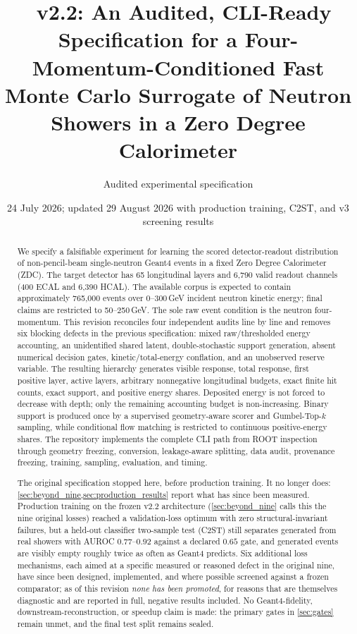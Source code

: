 \documentclass[10pt,a4paper]{article}
\title{\model\ v2.2: An Audited, CLI-Ready Specification for a Four-Momentum-Conditioned Fast Monte Carlo Surrogate of Neutron Showers in a Zero Degree Calorimeter}
\author{Audited experimental specification}
\date{24 July 2026; updated 29 August 2026 with production training, C2ST, and v3 screening results}
\begin{document}
\maketitle

\begin{abstract}
We specify a falsifiable experiment for learning the scored detector-readout distribution of non-pencil-beam single-neutron Geant4 events in a fixed Zero Degree Calorimeter (ZDC). The target detector has 65 longitudinal layers and 6,790 valid readout channels (400 ECAL and 6,390 HCAL). The available corpus is expected to contain approximately 765,000 events over 0--300\,GeV incident neutron kinetic energy; final claims are restricted to 50--250\,GeV. The sole raw event condition is the neutron four-momentum. This revision reconciles four independent audits line by line and removes six blocking defects in the previous specification: mixed raw/thresholded energy accounting, an unidentified shared latent, double-stochastic support generation, absent numerical decision gates, kinetic/total-energy conflation, and an unobserved reserve variable. The resulting hierarchy generates visible response, total response, first positive layer, active layers, arbitrary nonnegative longitudinal budgets, exact finite hit counts, exact support, and positive energy shares. Deposited energy is not forced to decrease with depth; only the remaining accounting budget is non-increasing. Binary support is produced once by a supervised geometry-aware scorer and Gumbel-Top-$k$ sampling, while conditional flow matching is restricted to continuous positive-energy shares. The repository implements the complete CLI path from ROOT inspection through geometry freezing, conversion, leakage-aware splitting, data audit, provenance freezing, training, sampling, evaluation, and timing.

The original specification stopped here, before production training. It no longer does: \cref{sec:beyond_nine,sec:production_results} report what has since been measured. Production training on the frozen $\mathrm{v2.2}$ architecture (\cref{sec:beyond_nine} calls this the nine original losses) reached a validation-loss optimum with zero structural-invariant failures, but a held-out classifier two-sample test (C2ST) still separates generated from real showers with AUROC $0.77$--$0.92$ against a declared $0.65$ gate, and generated events are visibly empty roughly twice as often as Geant4 predicts. Six additional loss mechanisms, each aimed at a specific measured or reasoned defect in the original nine, have since been designed, implemented, and where possible screened against a frozen comparator; as of this revision \emph{none has been promoted}, for reasons that are themselves diagnostic and are reported in full, negative results included. No Geant4-fidelity, downstream-reconstruction, or speedup claim is made: the primary gates in \cref{sec:gates} remain unmet, and the final test split remains sealed.
\end{abstract}
\end{document}
